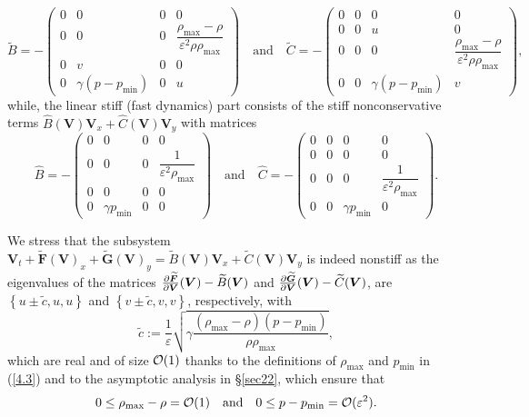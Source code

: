 \documentclass[A4paper,12pt,twoside]{article}
\numberwithin{equation}{section}
\numberwithin{figure}{section}
\numberwithin{table}{section}
\newcommand{\mF}{\bm{F}}
\newcommand{\mG}{\bm{G}}
\newcommand{\ve}{\varepsilon}
\newcommand\eref[1]{(\ref{#1})}
\newcommand{\uvec}[2][3]{\boldsymbol{#2\mkern-#1mu}\mkern#1mu}
\begin{document}
\begin{equation*}
\widetilde B=-\begin{pmatrix}0&0&0&0\\0&0&0&\dfrac{\rho_{\max}-\rho}{\ve^2\rho\rho_{\max}}\\0&v&0&0\\0&\gamma(p-p_{\min})&0&u\end{pmatrix}
\quad\mbox{and}\quad
\widetilde C=-\begin{pmatrix}0&0&0&0\\0&0&u&0\\0&0&0&\dfrac{\rho_{\max}-\rho}{\ve^2\rho\rho_{\max}}\\0&0&\gamma(p-p_{\min})&v\end{pmatrix},
\end{equation*}
while, the linear stiff (fast dynamics) part consists of the stiff nonconservative terms 
$\widehat B(\bm V)\bm V_x+\widehat C(\bm V)\bm V_y$
with matrices
\begin{equation*}
\widehat B=-\begin{pmatrix}0&0&0&0\\0&0&0&\dfrac{1}{\ve^2\rho_{\max}}\\0&0&0&0\\0&\gamma p_{\min}&0&0\end{pmatrix}
\quad\mbox{and}\quad
\widehat C=-\begin{pmatrix}0&0&0&0\\0&0&0&0\\0&0&0&\dfrac{1}{\ve^2\rho_{\max}}\\0&0&\gamma p_{\min}&0\end{pmatrix}.
\end{equation*}

We stress that the subsystem
$\bm V_t+\widetilde{\mF}(\bm V)_x+\widetilde{\mG}(\bm V)_y=\widetilde B(\bm V)\bm V_x+\widetilde C(\bm V)\bm V_y$ is indeed nonstiff as the
eigenvalues of the matrices
$\frac{\partial\widetilde{\mF}}{\partial\bm V}(\uvec{V})-\widetilde B(\bm V)$ and
$\frac{\partial\widetilde{\mG}}{\partial\bm V}(\uvec{V})-\widetilde C(\bm V)$, are $\left\{u\pm\tilde c,u,u\right\}$ and
$\left\{v\pm\tilde c,v,v\right\}$, respectively, with 
\begin{equation}
\tilde c:=\frac{1}{\ve}\sqrt{\gamma\frac{(\rho_{\max}-\rho)(p-p_{\min})}{\rho\rho_{\max}}},
\label{4.48f}
\end{equation}
which are real and of size ${\cal O}(1)$ thanks to the definitions of $\rho_{\max}$ and $p_{\min}$ in \eref{4.3} and to the asymptotic
analysis in \S\ref{sec22}, which ensure that
\begin{equation}
0\le\rho_{\max}-\rho={\cal O}(1)\quad\mbox{and}\quad0\le p-p_{\min}={\cal O}(\ve^2).
\label{4.7}
\end{equation}
\end{document}
